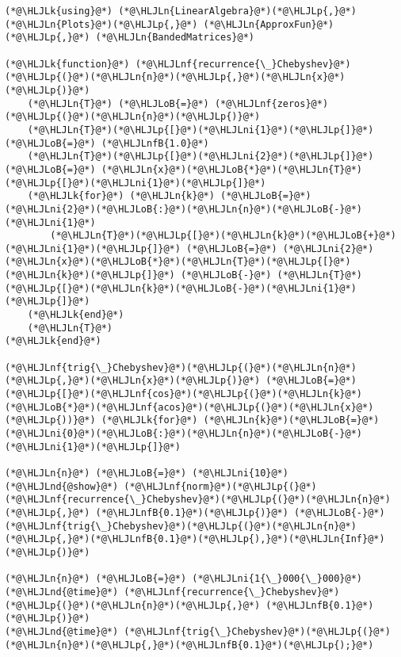\documentclass[12pt,a4paper]{article}
\newcommand{\HLJLk}[1]{\textcolor[RGB]{148,91,176}{\textbf{#1}}}
\newcommand{\HLJLn}[1]{#1}
\newcommand{\HLJLnd}[1]{\textcolor[RGB]{214,102,97}{#1}}
\newcommand{\HLJLnf}[1]{\textcolor[RGB]{66,102,213}{#1}}
\newcommand{\HLJLnfB}[1]{\textcolor[RGB]{59,151,46}{#1}}
\newcommand{\HLJLni}[1]{\textcolor[RGB]{59,151,46}{#1}}
\newcommand{\HLJLoB}[1]{\textcolor[RGB]{102,102,102}{\textbf{#1}}}
\newcommand{\HLJLp}[1]{#1}
\begin{document}
\begin{lstlisting}
(*@\HLJLk{using}@*) (*@\HLJLn{LinearAlgebra}@*)(*@\HLJLp{,}@*) (*@\HLJLn{Plots}@*)(*@\HLJLp{,}@*) (*@\HLJLn{ApproxFun}@*)(*@\HLJLp{,}@*) (*@\HLJLn{BandedMatrices}@*)

(*@\HLJLk{function}@*) (*@\HLJLnf{recurrence{\_}Chebyshev}@*)(*@\HLJLp{(}@*)(*@\HLJLn{n}@*)(*@\HLJLp{,}@*)(*@\HLJLn{x}@*)(*@\HLJLp{)}@*)
    (*@\HLJLn{T}@*) (*@\HLJLoB{=}@*) (*@\HLJLnf{zeros}@*)(*@\HLJLp{(}@*)(*@\HLJLn{n}@*)(*@\HLJLp{)}@*)
    (*@\HLJLn{T}@*)(*@\HLJLp{[}@*)(*@\HLJLni{1}@*)(*@\HLJLp{]}@*) (*@\HLJLoB{=}@*) (*@\HLJLnfB{1.0}@*)
    (*@\HLJLn{T}@*)(*@\HLJLp{[}@*)(*@\HLJLni{2}@*)(*@\HLJLp{]}@*) (*@\HLJLoB{=}@*) (*@\HLJLn{x}@*)(*@\HLJLoB{*}@*)(*@\HLJLn{T}@*)(*@\HLJLp{[}@*)(*@\HLJLni{1}@*)(*@\HLJLp{]}@*)
    (*@\HLJLk{for}@*) (*@\HLJLn{k}@*) (*@\HLJLoB{=}@*) (*@\HLJLni{2}@*)(*@\HLJLoB{:}@*)(*@\HLJLn{n}@*)(*@\HLJLoB{-}@*)(*@\HLJLni{1}@*)
        (*@\HLJLn{T}@*)(*@\HLJLp{[}@*)(*@\HLJLn{k}@*)(*@\HLJLoB{+}@*)(*@\HLJLni{1}@*)(*@\HLJLp{]}@*) (*@\HLJLoB{=}@*) (*@\HLJLni{2}@*)(*@\HLJLn{x}@*)(*@\HLJLoB{*}@*)(*@\HLJLn{T}@*)(*@\HLJLp{[}@*)(*@\HLJLn{k}@*)(*@\HLJLp{]}@*) (*@\HLJLoB{-}@*) (*@\HLJLn{T}@*)(*@\HLJLp{[}@*)(*@\HLJLn{k}@*)(*@\HLJLoB{-}@*)(*@\HLJLni{1}@*)(*@\HLJLp{]}@*)
    (*@\HLJLk{end}@*)
    (*@\HLJLn{T}@*)
(*@\HLJLk{end}@*)

(*@\HLJLnf{trig{\_}Chebyshev}@*)(*@\HLJLp{(}@*)(*@\HLJLn{n}@*)(*@\HLJLp{,}@*)(*@\HLJLn{x}@*)(*@\HLJLp{)}@*) (*@\HLJLoB{=}@*) (*@\HLJLp{[}@*)(*@\HLJLnf{cos}@*)(*@\HLJLp{(}@*)(*@\HLJLn{k}@*)(*@\HLJLoB{*}@*)(*@\HLJLnf{acos}@*)(*@\HLJLp{(}@*)(*@\HLJLn{x}@*)(*@\HLJLp{))}@*) (*@\HLJLk{for}@*) (*@\HLJLn{k}@*)(*@\HLJLoB{=}@*)(*@\HLJLni{0}@*)(*@\HLJLoB{:}@*)(*@\HLJLn{n}@*)(*@\HLJLoB{-}@*)(*@\HLJLni{1}@*)(*@\HLJLp{]}@*)

(*@\HLJLn{n}@*) (*@\HLJLoB{=}@*) (*@\HLJLni{10}@*)
(*@\HLJLnd{@show}@*) (*@\HLJLnf{norm}@*)(*@\HLJLp{(}@*)(*@\HLJLnf{recurrence{\_}Chebyshev}@*)(*@\HLJLp{(}@*)(*@\HLJLn{n}@*)(*@\HLJLp{,}@*) (*@\HLJLnfB{0.1}@*)(*@\HLJLp{)}@*) (*@\HLJLoB{-}@*) (*@\HLJLnf{trig{\_}Chebyshev}@*)(*@\HLJLp{(}@*)(*@\HLJLn{n}@*)(*@\HLJLp{,}@*)(*@\HLJLnfB{0.1}@*)(*@\HLJLp{),}@*)(*@\HLJLn{Inf}@*)(*@\HLJLp{)}@*)

(*@\HLJLn{n}@*) (*@\HLJLoB{=}@*) (*@\HLJLni{1{\_}000{\_}000}@*)
(*@\HLJLnd{@time}@*) (*@\HLJLnf{recurrence{\_}Chebyshev}@*)(*@\HLJLp{(}@*)(*@\HLJLn{n}@*)(*@\HLJLp{,}@*) (*@\HLJLnfB{0.1}@*)(*@\HLJLp{)}@*)
(*@\HLJLnd{@time}@*) (*@\HLJLnf{trig{\_}Chebyshev}@*)(*@\HLJLp{(}@*)(*@\HLJLn{n}@*)(*@\HLJLp{,}@*)(*@\HLJLnfB{0.1}@*)(*@\HLJLp{);}@*)
\end{lstlisting}
\end{document}
